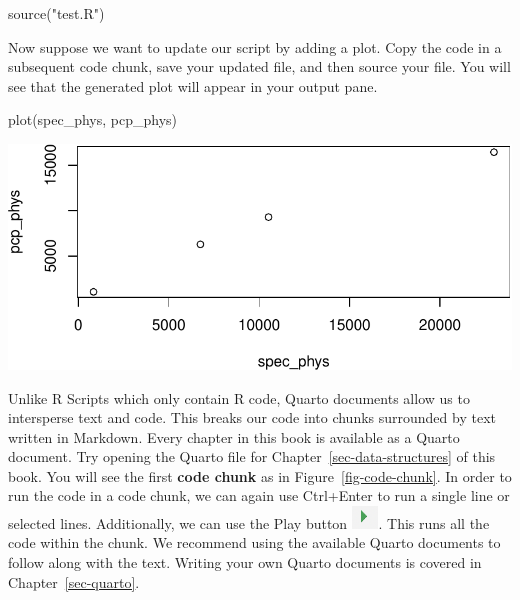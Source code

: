 \documentclass[
  letterpaper,
]{latex/krantz}
\makeatletter
\newenvironment{Shaded}{\begin{snugshade}}{\end{snugshade}}
\newcommand{\FunctionTok}[1]{\textcolor[rgb]{0.28,0.35,0.67}{#1}}
\newcommand{\NormalTok}[1]{\textcolor[rgb]{0.00,0.23,0.31}{#1}}
\newcommand{\StringTok}[1]{\textcolor[rgb]{0.13,0.47,0.30}{#1}}
\newenvironment{kframe}{%
\medskip{}
\setlength{\fboxsep}{.8em}
 \def\at@end@of@kframe{}%
 \ifinner\ifhmode%
  \def\at@end@of@kframe{\end{minipage}}%
  \begin{minipage}{\columnwidth}%
 \fi\fi%
 \def\FrameCommand##1{\hskip\@totalleftmargin \hskip-\fboxsep
 \colorbox{shadecolor}{##1}\hskip-\fboxsep
     \hskip-\linewidth \hskip-\@totalleftmargin \hskip\columnwidth}%
 \MakeFramed {\advance\hsize-\width
   \@totalleftmargin\z@ \linewidth\hsize
   \@setminipage}}%
 {\par\unskip\endMakeFramed%
 \at@end@of@kframe}
\renewenvironment{Shaded}{\begin{kframe}}{\end{kframe}}
\makeatother
\begin{document}
\begin{Shaded}
\begin{Highlighting}[]
\FunctionTok{source}\NormalTok{(}\StringTok{"test.R"}\NormalTok{)}
\end{Highlighting}
\end{Shaded}

Now suppose we want to update our script by adding a plot. Copy the code
in a subsequent code chunk, save your updated file, and then source your
file. You will see that the generated plot will appear in your output
pane.

\begin{Shaded}
\begin{Highlighting}[]
\FunctionTok{plot}\NormalTok{(spec\_phys, pcp\_phys)}
\end{Highlighting}
\end{Shaded}

\begin{center}
\includegraphics[width=1\textwidth,height=\textheight]{book/intro_to_r_files/figure-pdf/unnamed-chunk-5-1.pdf}
\end{center}

Unlike R Scripts which only contain R code, Quarto
 documents allow us to intersperse text and
code. This breaks our code into chunks surrounded by text written in
Markdown. Every chapter in this book is available as a Quarto document.
Try opening the Quarto file for Chapter~\ref{sec-data-structures} of
this book. You will see the first \textbf{code chunk}
 as in Figure~\ref{fig-code-chunk}. In order to
run the code in a code chunk, we can again use Ctrl+Enter to run a
single line or selected lines. Additionally, we can use the Play button
\includegraphics[width=0.27778in,height=\textheight]{book/images/intro_to_r/run-current-chunk.png}.
This runs all the code within the chunk. We recommend using the
available Quarto documents to follow along with the text. Writing your
own Quarto documents is covered in Chapter~\ref{sec-quarto}.
\end{document}
